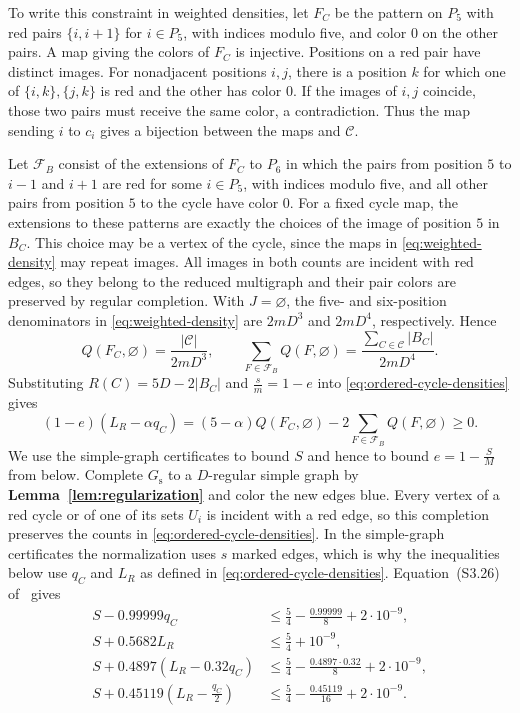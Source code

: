 \documentclass[preprint,11pt,numbers]{elsarticle-arxiv}
\numberwithin{equation}{section}
\theoremstyle{definition}
\begin{document}
To write this constraint in weighted densities, let $F_C$ be
the pattern on $P_5$ with red pairs $\{i,i+1\}$ for $i\in P_5$,
with indices modulo five, and color $0$ on the other pairs.
A map giving the colors of $F_C$ is
injective. Positions on a red pair have distinct images. For
nonadjacent positions $i,j$, there is a position $k$ for which
one of $\{i,k\},\{j,k\}$ is red and the other has color $0$.
If the images of $i,j$ coincide, those two pairs must receive
the same color, a contradiction. Thus the map sending $i$ to
$c_i$ gives a bijection between the maps and $\mathcal C$.

Let $\mathcal F_B$ consist of the extensions of $F_C$ to $P_6$
in which the pairs from position $5$ to $i-1$ and $i+1$ are
red for some $i\in P_5$, with indices modulo five, and all
other pairs from position $5$ to the cycle have color $0$.
For a fixed cycle map, the extensions to these patterns are
exactly the choices of the image of position $5$ in $B_C$.
This choice may be a vertex of the cycle, since the maps in
\eqref{eq:weighted-density} may repeat images.
All images in both counts are incident with red edges, so
they belong to the reduced multigraph and their pair colors
are preserved by regular completion. With $J=\varnothing$,
the five- and six-position denominators in
\eqref{eq:weighted-density} are $2mD^3$ and $2mD^4$,
respectively. Hence
\[
 Q(F_C,\varnothing)=\frac{|\mathcal C|}{2mD^3},\qquad
 \sum_{F\in\mathcal F_B}Q(F,\varnothing)
    =\frac{\sum_{C\in\mathcal C}|B_C|}{2mD^4}.
\]
Substituting $R(C)=5D-2|B_C|$ and $\frac{s}{m}=1-e$ into
\eqref{eq:ordered-cycle-densities} gives
\begin{equation}\label{eq:main-uniform-cycle-constraint}
 (1-e)(L_R-\alpha q_C)
  =(5-\alpha)Q(F_C,\varnothing)
      -2\sum_{F\in\mathcal F_B}Q(F,\varnothing)\geq0.
\end{equation}
We use the simple-graph certificates to bound $S$ and hence
to bound $e=1-\frac{S}{M}$ from below. Complete $G_{\mathrm s}$ to a
$D$-regular simple graph by \textbf{Lemma~\ref{lem:regularization}}
and color the new edges blue. Every vertex of a red cycle or
of one of its sets $U_i$ is incident with a red edge, so this
completion preserves the counts in
\eqref{eq:ordered-cycle-densities}. In the simple-graph
certificates the normalization uses $s$ marked edges, which
is why the inequalities below use $q_C$ and $L_R$ as defined
in \eqref{eq:ordered-cycle-densities}.
Equation~(S3.26) of~\cite{FGSTSupplement}
gives
\begin{equation}\label{eq:main-uniform-simple-certificates}
\begin{aligned}
 S-0.99999q_C
   &\leq \frac54-\frac{0.99999}{8}+2\cdot10^{-9},\\
 S+0.5682L_R
   &\leq \frac54+10^{-9},\\
 S+0.4897(L_R-0.32q_C)
   &\leq \frac54-\frac{0.4897\cdot0.32}{8}+2\cdot10^{-9},\\
  S+0.45119\left(L_R-\frac{q_C}{2}\right)
   &\leq \frac54-\frac{0.45119}{16}+2\cdot10^{-9}.
\end{aligned}
\end{equation}
\end{document}
